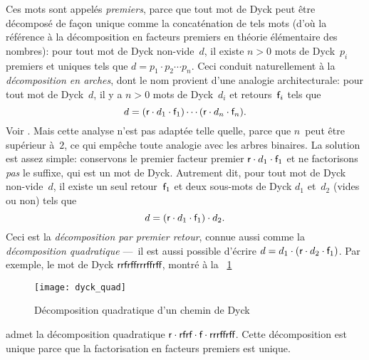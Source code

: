 Ces mots sont appelés \emph{premiers}, parce que tout mot de Dyck peut
être décomposé de façon unique comme la concaténation de tels mots
(d'où la référence à la décomposition en facteurs premiers en théorie
élémentaire des nombres): pour tout mot de Dyck non-vide~\(d\), il
existe \({n > 0}\) mots de Dyck~\(p_i\) premiers et uniques tels que
\(d = p_1 \cdot p_2 \cdots p_n\). Ceci conduit naturellement à la
\emph{décomposition en arches}, dont le nom provient d'une
analogie architecturale: pour tout mot de Dyck~\(d\), il y a \({n >
  0}\) mots de Dyck~\(d_i\) et retours~\(\textsf{f}_i\) tels que
\begin{equation*}
d = (\textsf{r} \cdot d_1 \cdot \textsf{f}_1) \cdots (\textsf{r} \cdot d_n
\cdot \textsf{f}_n).
\end{equation*}
Voir \cite{PanayotopoulosSapounakis_1995,
  Lothaire_2005,FlajoletSedgewick_2009}. Mais cette analyse n'est pas
adaptée telle quelle, parce que \(n\)~peut être supérieur à~\(2\), ce
qui empêche toute analogie avec les arbres binaires. La solution est
assez simple: conservons le premier facteur premier \(\textsf{r} \cdot
d_1 \cdot \textsf{f}_1\) et ne factorisons \emph{pas} le suffixe, qui est
un mot de Dyck. Autrement dit, pour tout mot de Dyck non-vide~\(d\),
il existe un seul retour~\(\textsf{f}_1\) et deux sous-mots de Dyck
\(d_1\) et~\(d_2\) (vides ou non) tels que
\begin{equation*}
d = (\textsf{r} \cdot d_1 \cdot \textsf{f}_1) \cdot d_2.
\end{equation*}
Ceci est la \emph{décomposition par premier retour}, connue aussi comme la
\emph{décomposition quadratique} ---~il est aussi possible
d'écrire \(d = d_1 \cdot (\textsf{r} \cdot d_2 \cdot \textsf{f}_1)\). Par
exemple, le mot de Dyck \(\textsf{rrfrffrrrffrff}\), montré à la
\fig~\ref{fig:dyck_quad}
\begin{figure}
\centering
\texttt{[image: dyck\_quad]}
\caption{Décomposition quadratique d'un chemin de Dyck}
\label{fig:dyck_quad}
\end{figure}
admet la décomposition quadratique \(\textsf{r} \cdot \textsf{rfrf} \cdot
\textsf{f} \cdot \textsf{rrrffrff}\). Cette décomposition est unique parce
que la factorisation en facteurs premiers est unique.

